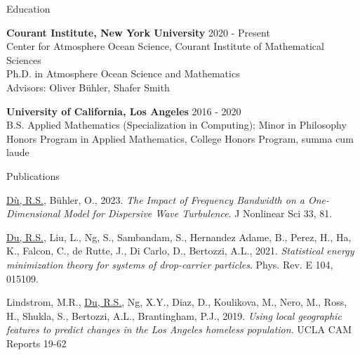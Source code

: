 \documentclass{resume} %
\begin{document}

\begin{rSection}{Education}

{\bf Courant Institute, New York University} \hfill {2020 - Present} \\
Center for Atmosphere Ocean Science, Courant Institute of Mathematical Sciences\\
Ph.D. in Atmosphere Ocean Science and Mathematics\\
Advisors: Oliver B\"uhler, Shafer Smith

{\bf University of California, Los Angeles} \hfill {2016 - 2020} \\
B.S. Applied Mathematics (Specialization in Computing); Minor in Philosophy\\
Honors Program in Applied Mathematics, College Honors Program, summa cum laude


\end{rSection}


\begin{rSection}{Publications}
\begin{etaremune}
    \item \underline{D\`u, R.S.}, B\"uhler, O., 2023. \textit{The Impact of Frequency Bandwidth on a One-Dimensional Model for Dispersive Wave Turbulence}. J Nonlinear Sci 33, 81.
    \item \underline{Du, R.S.}, Liu, L., Ng, S., Sambandam, S., Hernandez Adame, B., Perez, H., Ha, K., Falcon, C., de Rutte, J., Di Carlo, D., Bertozzi, A.L., 2021. \textit{Statistical energy minimization theory for systems of drop-carrier particles}. Phys. Rev. E 104, 015109.
    \item Lindstrom, M.R., \underline{Du, R.S.}, Ng, X.Y., Diaz, D., Koulikova, M., Nero, M., Ross, H., Shukla, S., Bertozzi, A.L., Brantingham, P.J., 2019. \textit{Using local geographic features to predict changes in the Los Angeles homeless population}. UCLA CAM Reports 19-62
\end{etaremune}
\end{rSection}
\end{document}
